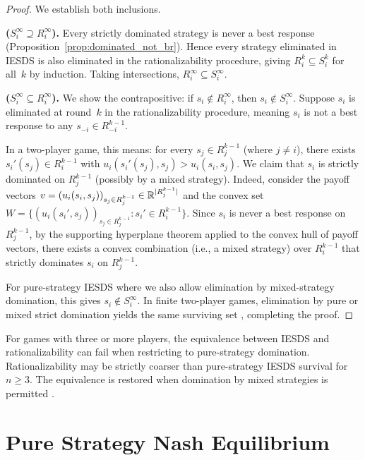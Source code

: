 \documentclass[11pt,a4paper]{article}
\begin{document}
\begin{proof}
We establish both inclusions.

\medskip
\noindent\textbf{($S_i^\infty \supseteq R_i^\infty$).}
Every strictly dominated strategy is never a best response
(Proposition~\ref{prop:dominated_not_br}).  Hence every strategy eliminated
in IESDS is also eliminated in the rationalizability procedure, giving
$R_i^k \subseteq S_i^k$ for all~$k$ by induction.  Taking intersections,
$R_i^\infty \subseteq S_i^\infty$.

\medskip
\noindent\textbf{($S_i^\infty \subseteq R_i^\infty$).}
We show the contrapositive: if $s_i \notin R_i^\infty$, then
$s_i \notin S_i^\infty$.  Suppose $s_i$ is eliminated at round~$k$ in the
rationalizability procedure, meaning $s_i$ is not a best response to any
$s_{-i} \in R_{-i}^{k-1}$.

In a two-player game, this means: for every $s_j \in R_j^{k-1}$ (where
$j \neq i$), there exists $s_i'(s_j) \in R_i^{k-1}$ with
$u_i(s_i'(s_j), s_j) > u_i(s_i, s_j)$.  We claim that $s_i$ is strictly
dominated on $R_j^{k-1}$ (possibly by a mixed strategy).  Indeed, consider
the payoff vectors $v = (u_i(s_i, s_j))_{s_j \in R_j^{k-1}}
\in \mathbb{R}^{|R_j^{k-1}|}$
and the convex set
$W = \{(u_i(s_i', s_j))_{s_j \in R_j^{k-1}} : s_i' \in R_i^{k-1}\}$.
Since $s_i$ is never a best response on $R_j^{k-1}$, by the supporting
hyperplane theorem applied to the convex hull of payoff vectors, there
exists a convex combination (i.e., a mixed strategy) over $R_i^{k-1}$ that
strictly dominates $s_i$ on $R_j^{k-1}$.

For pure-strategy IESDS where we also allow elimination by mixed-strategy
domination, this gives $s_i \notin S_i^\infty$.  In finite two-player games,
elimination by pure or mixed strict domination yields the same surviving
set \citep{osborne1994}, completing the proof.
\end{proof}

\begin{warning}
For games with three or more players, the equivalence between IESDS and
rationalizability can fail when restricting to pure-strategy domination.
Rationalizability may be strictly coarser than pure-strategy IESDS survival
for $n \geq 3$.  The equivalence is restored when domination by mixed
strategies is permitted \citep{fudenberg1991}.
\end{warning}


\section{Pure Strategy Nash Equilibrium}
\label{sec:nash}
\end{document}
